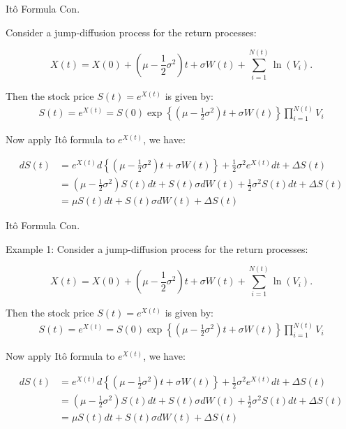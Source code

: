 \documentclass{beamer}
\begin{document}
 \begin{frame}{Itô Formula Con.}

    {\footnotesize \footnotesize
    \par Consider a jump-diffusion process for the return processes:

    \[
    X(t) = X(0) + (\mu - \frac{1}{2} \sigma^2)t + \sigma W(t) + \sum_{i=1}^{N(t)} \ln(V_i).
    \]

    \par Then the stock price \( S(t) = e^{X(t)} \) is given by:
    \begin{align*}
        S(t) = e^{X(t)} = S(0) \exp \left\{ (\mu - \frac{1}{2} \sigma^2)t 
        + \sigma W(t) \right\} \prod_{i=1}^{N(t)} V_i
    \end{align*}
    \par Now apply Itô formula to \( e^{X(t)} \), we have:

    \[
    \begin{aligned}
    dS(t) &= e^{X(t)} d \left\{ (\mu - \frac{1}{2} \sigma^2)t + \sigma W(t) \right\} + \frac{1}{2} \sigma^2 e^{X(t)} dt + \Delta S(t) \\
    &= (\mu - \frac{1}{2} \sigma^2) S(t) dt + S(t) \sigma dW(t) + \frac{1}{2} \sigma^2 S(t) dt + \Delta S(t) \\
    &= \mu S(t) dt + S(t) \sigma dW(t) + \Delta S(t)
    \end{aligned}
    \]
    }
    
\end{frame}

 \begin{frame}{Itô Formula Con.}

    {\footnotesize \footnotesize
    \par Example 1: Consider a jump-diffusion process for the return processes:

    \[
    X(t) = X(0) + (\mu - \frac{1}{2} \sigma^2)t + \sigma W(t) + \sum_{i=1}^{N(t)} \ln(V_i).
    \]

    \par Then the stock price \( S(t) = e^{X(t)} \) is given by:
    \begin{align*}
        S(t) = e^{X(t)} = S(0) \exp \left\{ (\mu - \frac{1}{2} \sigma^2)t 
        + \sigma W(t) \right\} \prod_{i=1}^{N(t)} V_i
    \end{align*}
    \par Now apply Itô formula to \( e^{X(t)} \), we have:

    \[
    \begin{aligned}
    dS(t) &= e^{X(t)} d \left\{ (\mu - \frac{1}{2} \sigma^2)t + \sigma W(t) \right\} + \frac{1}{2} \sigma^2 e^{X(t)} dt + \Delta S(t) \\
    &= (\mu - \frac{1}{2} \sigma^2) S(t) dt + S(t) \sigma dW(t) + \frac{1}{2} \sigma^2 S(t) dt + \Delta S(t) \\
    &= \mu S(t) dt + S(t) \sigma dW(t) + \Delta S(t)
    \end{aligned}
    \]
    }
    
\end{frame}
\end{document}
